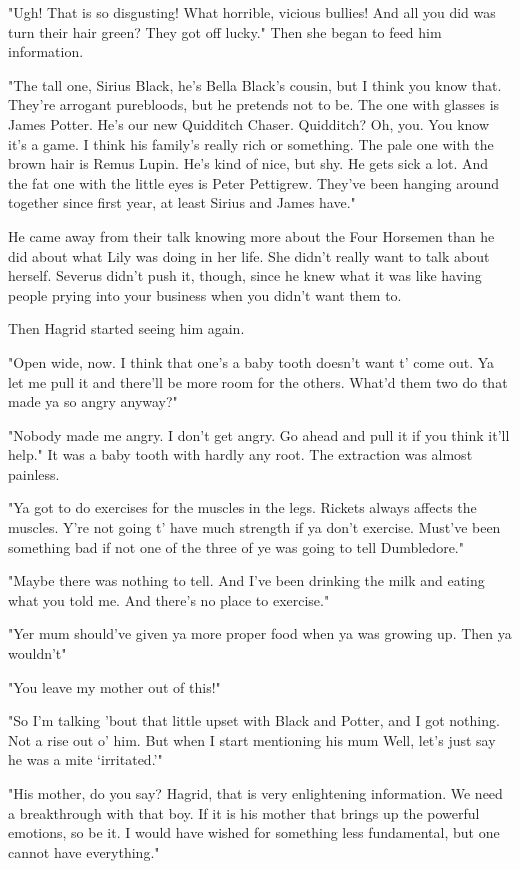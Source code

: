 "Ugh! That is so disgusting! What horrible, vicious bullies! And all you did was turn their hair green? They got off lucky." Then she began to feed him information.

"The tall one, Sirius Black, he's Bella Black's cousin, but I think you know that. They're arrogant purebloods, but he pretends not to be. The one with glasses is James Potter. He's our new Quidditch Chaser. Quidditch? Oh, you. You know it's a game. I think his family's really rich or something. The pale one with the brown hair is Remus Lupin. He's kind of nice, but shy. He gets sick a lot. And the fat one with the little eyes is Peter Pettigrew. They've been hanging around together since first year, at least Sirius and James have."

He came away from their talk knowing more about the Four Horsemen than he did about what Lily was doing in her life. She didn't really want to talk about herself. Severus didn't push it, though, since he knew what it was like having people prying into your business when you didn't want them to.

Then Hagrid started seeing him again.

"Open wide, now. I think that one's a baby tooth doesn't want t' come out. Ya let me pull it and there'll be more room for the others. What'd them two do that made ya so angry anyway?"

"Nobody made me angry. I don't get angry. Go ahead and pull it if you think it'll help." It was a baby tooth with hardly any root. The extraction was almost painless.

"Ya got to do exercises for the muscles in the legs. Rickets always affects the muscles. Y're not going t' have much strength if ya don't exercise. Must've been something bad if not one of the three of ye was going to tell Dumbledore."

"Maybe there was nothing to tell. And I've been drinking the milk and eating what you told me. And there's no place to exercise."

"Yer mum should've given ya more proper food when ya was growing up. Then ya wouldn't{\el}"

"You leave my mother out of this!"

"So I'm talking 'bout that little upset with Black and Potter, and I got nothing. Not a rise out o' him. But when I start mentioning his mum{\el} Well, let's just say he was a mite `irritated.'"

"His mother, do you say? Hagrid, that is very enlightening information. We need a breakthrough with that boy. If it is his mother that brings up the powerful emotions, so be it. I would have wished for something less{\el} fundamental, but one cannot have everything."

